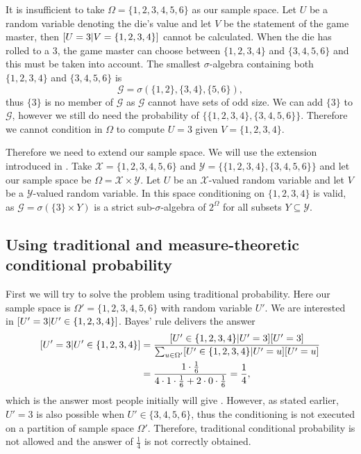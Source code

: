 \documentclass[a4paper]{report}
\theoremstyle{plain}
\theoremstyle{definition}
\theoremstyle{remark}
\numberwithin{equation}{chapter}
\let\P\relax
\DeclareMathOperator{\P}{\mathbb{P}}
\DeclareMathOperator{\1}{\mathbbm{1}}
\renewcommand{\G}{\mathcal{G}}
\newcommand{\X}{\mathcal{X}}
\newcommand{\Y}{\mathcal{Y}}
\begin{document}
It is insufficient to take $\Omega=\{1,2,3,4,5,6\}$ as our sample space. Let $U$ be a random variable denoting the die's value and let $V$ be the statement of the game master, then $\P[U=3|V=\{1,2,3,4\}]$ cannot be calculated. When the die has rolled to a $3$, the game master can choose between $\{1,2,3,4\}$ and $\{3,4,5,6\}$ and this must be taken into account. The smallest $\sigma$-algebra containing both $\{1,2,3,4\}$ and $\{3,4,5,6\}$ is
\begin{equation}
\G=\sigma(\{1,2\},\{3,4\},\{5,6\}),
\end{equation}
thus $\{3\}$ is no member of $\G$ as $\G$ cannot have sets of odd size. We can add $\{3\}$ to $\G$, however we still do need the probability of $\{\{1,2,3,4\},\{3,4,5,6\}\}$. Therefore we cannot condition in $\Omega$ to compute $U=3$ given $V=\{1,2,3,4\}$.

Therefore we need to extend our sample space. We will use the extension introduced in \cite{Grunwald13}. Take $\X=\{1,2,3,4,5,6\}$ and $\Y=\{\{1,2,3,4\},\{3,4,5,6\}\}$ and let our sample space be $\Omega=\X\times\Y$. Let $U$ be an $\X$-valued random variable and let $V$ be a $\Y$-valued random variable. In this space conditioning on $\{1,2,3,4\}$ is valid, as $\G=\sigma(\{3\}\times Y)$ is a strict sub-$\sigma$-algebra of $2^\Omega$ for all subsets $Y\subseteq\Y$.
\subsection{Using traditional and measure-theoretic conditional probability}
First we will try to solve the problem using traditional probability. Here our sample space is $\Omega'=\{1,2,3,4,5,6\}$ with random variable $U'$. We are interested in $\P[U'=3|U'\in\{1,2,3,4\}]$. Bayes' rule delivers the answer
\begin{align}
\P[U'=3|U'\in\{1,2,3,4\}]&=\frac{\P[U'\in\{1,2,3,4\}|U'=3]\P[U'=3]}{\sum_{u\in\Omega'}\P[U'\in\{1,2,3,4\}|U'=u]\P[U'=u]}\\
&=\frac{1\cdot\frac{1}{6}}{4\cdot1\cdot\frac{1}{6}+2\cdot0\cdot\frac{1}{6}}=\frac{1}{4},
\end{align}
which is the answer most people initially will give \cite{Grunwald13}. However, as stated earlier, $U'=3$ is also possible when $U'\in\{3,4,5,6\}$, thus the conditioning is not executed on a partition of sample space $\Omega'$. Therefore, traditional conditional probability is not allowed and the answer of $\frac{1}{4}$ is not correctly obtained.
\end{document}
